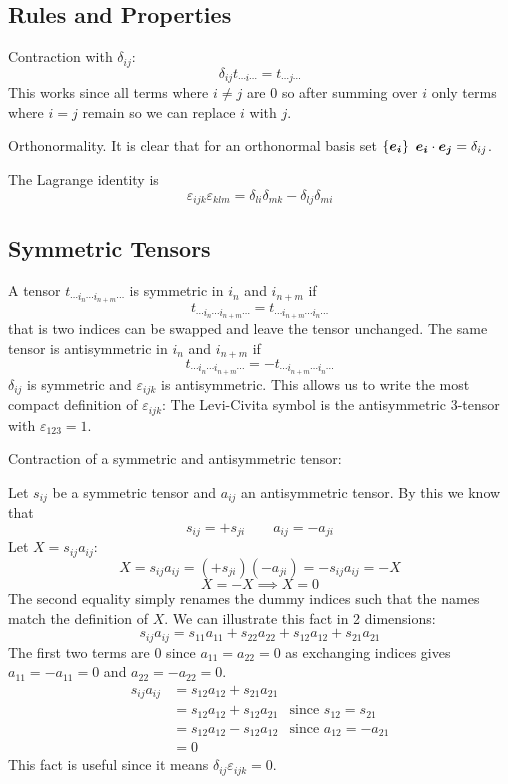 \documentclass{article}
\begin{document}
    \subsection{Rules and Properties}\label{sec:tensor properties}
    Contraction with \(\delta_{ij}\):
    \[\delta_{ij}t_{\dotsm i \dotsm} = t_{\dotsm j \dotsm}\]
    This works since all terms where \(i\ne j\) are 0 so after summing over \(i\) only terms where \(i = j\) remain so we can replace \(i\) with \(j\).
    
    Orthonormality. It is clear that for an orthonormal basis set \(\{\bm{e_{i}}\}\) \(\bm{e_{i}}\cdot \bm{e_{j}} = \delta_{ij}\).
    
    The Lagrange identity is
    \[\varepsilon_{ijk}\varepsilon_{klm} = \delta_{li}\delta_{mk} - \delta_{lj}\delta_{mi}\]
    
    \subsection{Symmetric Tensors}
    A tensor \(t_{\dotsm i_n\dotsm i_{n + m}\dotsm}\) is symmetric in \(i_n\) and \(i_{n + m}\) if
    \[t_{\dotsm i_n\dotsm i_{n + m}\dotsm} = t_{\dotsm i_{n + m}\dotsm i_{n}\dotsm}\]
    that is two indices can be swapped and leave the tensor unchanged.
    The same tensor is antisymmetric in \(i_n\) and \(i_{n + m}\) if
    \[t_{\dotsm i_n\dotsm i_{n + m}\dotsm} = -t_{\dotsm i_{n + m}\dotsm i_{n}\dotsm}\]
    \(\delta_{ij}\) is symmetric and \(\varepsilon_{ijk}\) is antisymmetric.
    This allows us to write the most compact definition of \(\varepsilon_{ijk}\): The Levi-Civita symbol is the antisymmetric 3-tensor with \(\varepsilon_{123} = 1\).
    
    Contraction of a symmetric and antisymmetric tensor:
    
    Let \(s_{ij}\) be a symmetric tensor and \(a_{ij}\) an antisymmetric tensor.
    By this we know that
    \[s_{ij} = +s_{ji}\qquad a_{ij} = -a_{ji}\]
    Let \(X = s_{ij}a_{ij}\):
    \[X = s_{ij}a_{ij} = (+s_{ji})(-a_{ji}) = -s_{ij}a_{ij} = -X\]
    \[X = - X \implies X = 0\]
    The second equality simply renames the dummy indices such that the names match the definition of \(X\).
    We can illustrate this fact in 2 dimensions:
    \[s_{ij}a_{ij} = s_{11}a_{11} + s_{22}a_{22} + s_{12}a_{12} + s_{21}a_{21}\]
    The first two terms are 0 since \(a_{11} = a_{22} = 0\) as exchanging indices gives \(a_{11} = -a_{11} = 0\) and \(a_{22} = -a_{22} = 0\).
    \begin{align*}
        s_{ij}a_{ij} &= s_{12}a_{12} + s_{21}a_{21}\\
        &= s_{12}a_{12} + s_{12}a_{21} &\text{since } s_{12} = s_{21}\\
        &= s_{12}a_{12} - s_{12}a_{12} &\text{since } a_{12} = -a_{21}\\
        &= 0
    \end{align*}
    This fact is useful since it means \(\delta_{ij}\varepsilon_{ijk} = 0\).
    
\end{document}

